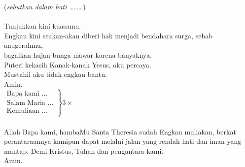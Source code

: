 \documentclass[12pt]{scrartcl}
\begin{document}
(\textit{sebutkan dalam hati} \ldots\ldots\ldots) \\
\\Tunjukkan kini kuasamu.\\ Engkau kini seakan-akan diberi hak menjadi bendahara surga, 
sebab anugerahmu, \\ bagaikan hujan bunga mawar karena banyaknya.\\
Puteri kekasih Kanak-kanak Yesus, aku percaya. \\Mustahil aku tidak engkau bantu. \\
Amin.\\

$ \left.
\begin{array}{c}
\textrm{Bapa kami \ldots} \\
\textrm{Salam Maria \ldots}\\
\textrm{Kemuliaan \ldots} \\
\end{array}
\right\rbrace 3 \times
$
\\

\\
Allah Bapa kami, hambaMu Santa Theresia sudah Engkau muliakan, berkat perantaraannya kamipun dapat melalui jalan yang rendah hati dan iman yang mantap. Demi Kristus, Tuhan dan pengantara kami. \\Amin.
\end{document}
